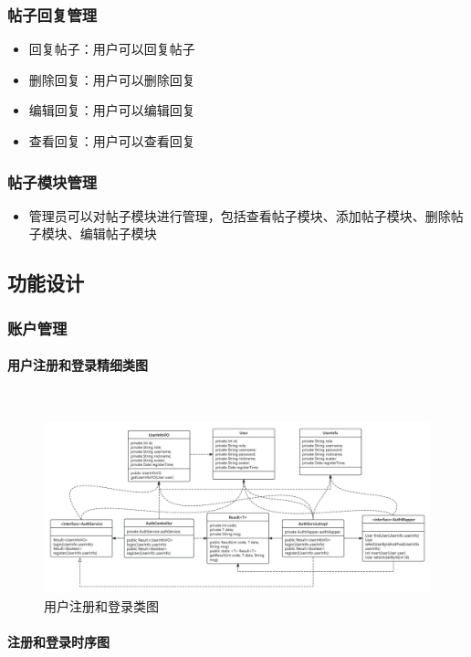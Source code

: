 \documentclass[UTF8]{ctexart}
\newcommand{\subsubsubsection}[1]{\paragraph{#1}\mbox{}\\} %
\begin{document}
\subsubsection{帖子回复管理}
\begin{itemize}
  \item 回复帖子：用户可以回复帖子
  \item 删除回复：用户可以删除回复
  \item 编辑回复：用户可以编辑回复
  \item 查看回复：用户可以查看回复
\end{itemize}

  
\subsubsection{帖子模块管理}
\begin{itemize}
  \item 管理员可以对帖子模块进行管理，包括查看帖子模块、添加帖子模块、删除帖子模块、编辑帖子模块
\end{itemize}


\subsection{功能设计}

\subsubsection{账户管理}

\subsubsubsection{用户注册和登录精细类图}

\begin{figure}[H]
  \centering
  \includegraphics[scale=0.2]{精化类模型图/auth.jpg}
  \caption{用户注册和登录类图}
\end{figure}


\subsubsubsection{注册和登录时序图}
\end{document}
